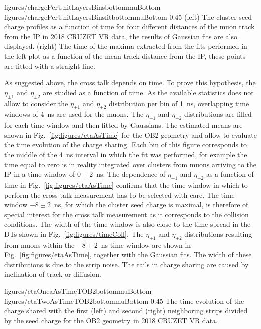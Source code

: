                 {figures/chargePerUnitLayersBinsbottommuBottom}
                 {figures/chargePerUnitLayersBinsfitbottommuBottom}
                 {0.45}       %
                 {(left) The cluster seed charge profiles as a function of time for four different distances of the muon track from the IP in 2018 CRUZET VR data, the results of Gaussian fits are also displayed. (right) The time of the maxima extracted from the fits performed in the left plot as a function of the mean track distance from the IP, these points are fitted with a straight line. }

As suggested above, the cross talk depends on time. To prove this hypothesis, the $\eta_{\pm 1}$ and $\eta_{\pm 2}$ are studied as a function of time. As the available statistics does not allow to consider the $\eta_{\pm 1}$ and $\eta_{\pm 2}$ distribution per bin of 1~ns, overlapping time windows of 4~ns are used for the muons. The $\eta_{\pm 1}$ and $\eta_{\pm 2}$ distributions are filled for each time window and then fitted by Gaussians. The estimated means are shown in Fig.~\ref{fig:figures/etaAsTime}  for the OB2 geometry and allow to evaluate the time evolution of the charge sharing. Each bin of this figure corresponds to the middle of the 4~ns interval in which the fit was performed, for example the time equal to zero is in reality integrated over clusters from muons arriving to the IP in a time window of $0 \pm 2$~ns. The dependence of $\eta_{\pm 1}$ and $\eta_{\pm 2}$ as a function of time in Fig.~\ref{fig:figures/etaAsTime} confirms that the time window in which to perform the cross talk measurement has to be selected with care. The time window $-8 \pm 2$~ns, for which the cluster seed charge is maximal, is therefore of special interest for the cross talk measurement as it corresponds to the collision conditions. The width of the time window is also close to the time spread in the DTs shown in Fig.~\ref{fig:figures/timeColl}. The $\eta_{\pm 1}$ and $\eta_{\pm 2}$ distributions resulting from muons within the $-8 \pm 2$~ns time window are shown in Fig.~\ref{fig:figures/etaAsTime}, together with the Gaussian fits.  The width of these distributions is due to the strip noise.  The tails in charge sharing are caused by inclination of track or diffusion.


                 {figures/etaOneaAsTimeTOB2bottommuBottom}
                 {figures/etaTwoAsTimeTOB2bottommuBottom} %
                 {0.45}       %
                 { The time evolution of the charge shared with the first (left) and second (right) neighboring strips divided by the seed charge for the OB2 geometry in 2018 CRUZET VR data.}

